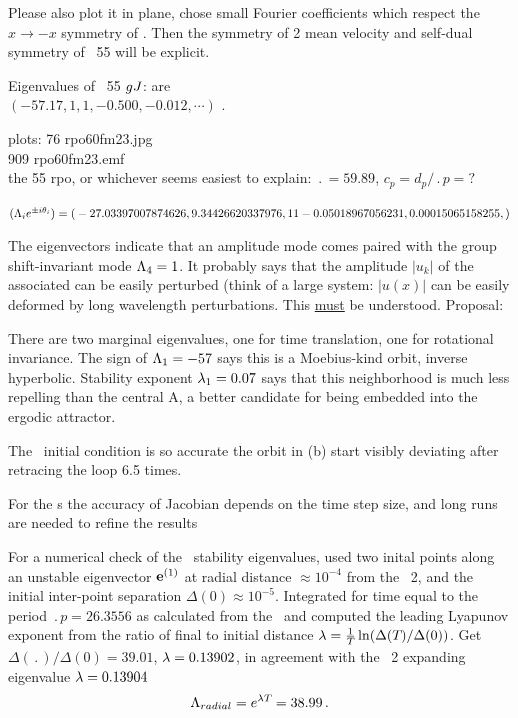 Please also plot it in plane, chose small Fourier coefficients
 which respect the $x \to -x$ symmetry of \KSe.
Then the symmetry of 2 mean velocity
{\eqva} and self-dual symmetry of \rpo\ {\nameit}55 will be explicit.

Eigenvalues of \rpo\ {\nameit}55 $g\jMps$: are
\\
$(-57.17,  1, 1, -0.500, -0.012, \cdots)$ .
%

plots:
  76 rpo60fm23.jpg  \\
 909 rpo60fm23.emf  \\
the 55 rpo, or whichever seems easiest to explain:
$\period{} = 59.89$,
$c_p = d_p/\period{p}= ?$

$(\ExpaEig_i e^{\pm i\theta_i})=
(
\\
 -27.03397007874626,
\\
   9.34426620337976,
\\
   1
\\
   1
\\
  -0.05018967056231,
\\
   0.00015065158255,
)$

The eigenvectors
indicate that an amplitude mode comes paired with the 
group shift-invariant mode $\ExpaEig_4 =1$. It probably says that
the amplitude $|u_k|$ of the associated can be easily perturbed (think of
a large system: $|u(x)|$ can be easily deformed by long wavelength
perturbations. This \underline{must} be understood. Proposal:

There are two
marginal eigenvalues, one for time translation, one for
rotational invariance. 
The sign of $\ExpaEig_{1}=-57$ says this is a Moebius-kind orbit,
inverse hyperbolic.
Stability exponent
 $\eigExp[1]=0.07$ says that this neighborhood is much less repelling than
the central {\eqv} A, a better candidate for being embedded into the
ergodic attractor.

The \rpo\ initial condition is
so accurate the orbit in (b)
start visibly deviating after retracing the loop 6.5 times.

For the \rpo s the accuracy of Jacobian depends
on the time step size, and long runs are needed to refine the results

For a numerical check of the \rpo\ stability eigenvalues,
used two inital
points along an unstable eigenvector $\jEigvec{1}$
at radial distance  $\approx 10^{-4}$ from the \eqv\ {\nameit}2,
and the initial inter-point separation $\Delta(0) \approx 10^{-5}$.
Integrated for time equal to the period $\period{p}=26.3556$ as calculated from
the \jacobianM\ and computed the leading Lyapunov exponent from the ratio of
final to initial distance 
$\Lyap= \frac{1 }{ \period{}}\ln( \Delta(\period{})/\Delta(0))$.
Get
$\Delta(\period{})/\Delta(0) =39.01$,
$\Lyap=0.13902$, in agreement with the \eqv\ {\nameit}2 
expanding eigenvalue $\Lyap=0.13904$
\[
\ExpaEig_{radial} =  e^{\Lyap \period{}} =38.99
\,.
\]

